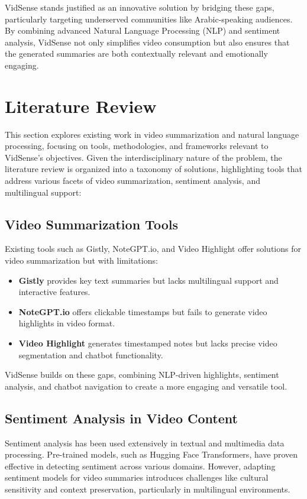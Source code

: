 \documentclass{bscs}
\begin{document}
VidSense stands justified as an innovative solution by bridging these gaps, particularly targeting underserved communities like Arabic-speaking audiences. By combining advanced Natural Language Processing (NLP) and sentiment analysis, VidSense not only simplifies video consumption but also ensures that the generated summaries are both contextually relevant and emotionally engaging.

\chapter{Literature Review}
This section explores existing work in video summarization and natural language processing, focusing on tools, methodologies, and frameworks relevant to VidSense's objectives.
Given the interdisciplinary nature of the problem, the literature review is organized into a taxonomy of solutions, highlighting tools that address various facets of video summarization, sentiment analysis, and multilingual support:

\section{Video Summarization Tools}
Existing tools such as Gistly, NoteGPT.io, and Video Highlight offer solutions for video summarization but with limitations:
\begin{itemize}
    \item \textbf{Gistly} provides key text summaries but lacks multilingual support and interactive features.
    \item \textbf{NoteGPT.io} offers clickable timestamps but fails to generate video highlights in video format.
    \item \textbf{Video Highlight} generates timestamped notes but lacks precise video segmentation and chatbot functionality.
\end{itemize}

VidSense builds on these gaps, combining NLP-driven highlights, sentiment analysis, and chatbot navigation to create a more engaging and versatile tool.

\section{Sentiment Analysis in Video Content}
Sentiment analysis has been used extensively in textual and multimedia data processing. Pre-trained models, such as Hugging Face Transformers, have proven effective in detecting sentiment across various domains. However, adapting sentiment models for video summaries introduces challenges like cultural sensitivity and context preservation, particularly in multilingual environments.
\end{document}
